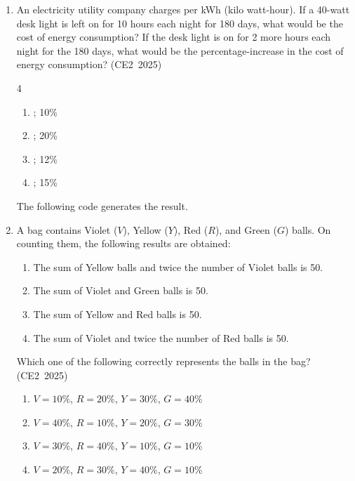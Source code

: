
\begin{enumerate}[label=\thesubsection.\arabic*, ref=\thesubsection.\theenumi,itemsep=0pt]

\item
An electricity utility company charges  per kWh
(kilo watt-hour). If a 40-watt desk light is left on for 10 hours
 each night for 180 days, what would be the cost of energy
consumption? If the desk light is on for 2 more hours each night
for the 180 days, what would be the percentage-increase in the
cost of energy consumption?
\hfill (CE2~2025)
%
\begin{multicols}{4}\begin{enumerate}
    \item {}; 10\%
    \item {}; 20\%
    \item {}; 12\%
    \item {}; 15\%
\end{enumerate}\end{multicols}
\solution
The following code generates the result.
\item
A bag contains Violet ($V$), Yellow ($Y$), Red ($R$), and Green
($G$) balls. On counting them, the following results are obtained:
%
\begin{enumerate}
    \item The sum of Yellow balls and twice the number of Violet
          balls is 50.
    \item The sum of Violet and Green balls is 50.
    \item The sum of Yellow and Red balls is 50.
    \item The sum of Violet and twice the number of Red balls is 50.
\end{enumerate}
%
Which one of the following correctly represents the balls in the bag?
\hfill (CE2~2025)
%
\begin{enumerate}
    \item $V=10\%$, $R=20\%$, $Y=30\%$, $G=40\%$
    \item $V=40\%$, $R=10\%$, $Y=20\%$, $G=30\%$
    \item $V=30\%$, $R=40\%$, $Y=10\%$, $G=10\%$
    \item $V=20\%$, $R=30\%$, $Y=40\%$, $G=10\%$

\end{enumerate}
\end{enumerate}
